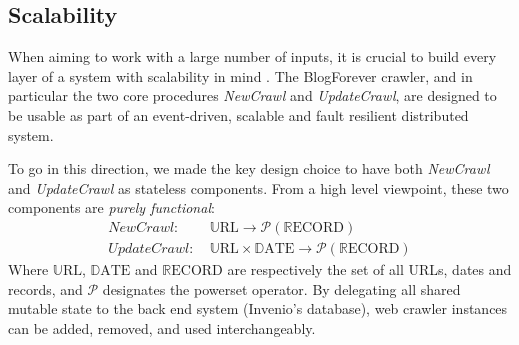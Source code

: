 \subsection{Scalability}
When aiming to work with a large number of inputs, it is crucial to build every layer of a system with scalability in mind \cite{thereactivemanifesto2013}. The BlogForever crawler, and in particular the two core procedures \emph{NewCrawl} and \emph{UpdateCrawl}, are designed to be usable as part of an event-driven, scalable and fault resilient distributed system.

To go in this direction, we made the key design choice to have both \emph{NewCrawl} and \emph{UpdateCrawl} as stateless components. From a high level viewpoint, these two components are \emph{purely functional}:
%
\newcommand\URL{\mathbb{U}\text{RL}}
\newcommand\DATE{\mathbb{D}\text{ATE}}
\newcommand\RECORD{\mathbb{R}\text{ECORD}}
\begin{equation*}
  \begin{split}
    NewCrawl:    &~ \URL \rightarrow \mathcal{P}(\RECORD)\\
    UpdateCrawl: &~ \URL \times \DATE \rightarrow \mathcal{P}(\RECORD)
  \end{split}
\end{equation*}
%
Where $\URL$, $\DATE$ and $\RECORD$ are respectively the set of all URLs, dates and records, and $\mathcal{P}$ designates the powerset operator. By delegating all shared mutable state to the back end system (Invenio's database), web crawler instances can be added, removed, and used interchangeably.
